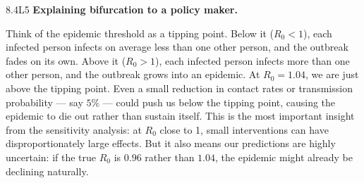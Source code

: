 \begin{solution}{8.4}{L5}
 \textbf{Explaining bifurcation to a policy maker.}

Think of the epidemic threshold as a tipping point. Below it ($R_0 < 1$),
each infected person infects on average less than one other person, and
the outbreak fades on its own. Above it ($R_0 > 1$), each infected person
infects more than one other person, and the outbreak grows into an epidemic.
At $R_0 = 1.04$, we are just above the tipping point. Even a small
reduction in contact rates or transmission probability — say $5\%$ —
could push us below the tipping point, causing the epidemic to die out
rather than sustain itself. This is the most important insight from the
sensitivity analysis: at $R_0$ close to 1, small interventions can have
disproportionately large effects. But it also means our predictions are
highly uncertain: if the true $R_0$ is $0.96$ rather than $1.04$, the
epidemic might already be declining naturally.


\end{solution}

